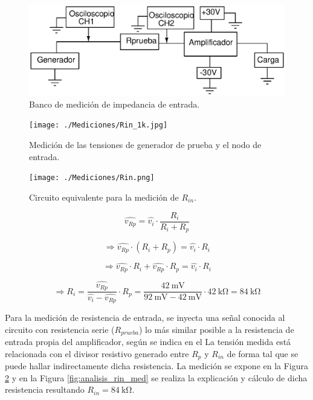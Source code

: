 		\begin{figure}[ H]
			\centering
			\includegraphics[scale=0.6]{./Figuras/bco_zo.eps}
			\caption{Banco de medición de impedancia de entrada.}
			\label{fig:rin_bco_med}
		\end{figure}
			
		\begin{figure}[ H]
			\centering
			\texttt{[image: ./Mediciones/Rin\_1k.jpg]}
			\caption{Medición de las tensiones de generador de prueba y el nodo de entrada.}
			\label{fig:rin_med}
		\end{figure}

		\begin{figure}[ H]
			\centering
			\texttt{[image: ./Mediciones/Rin.png]}
			\caption{Circuito equivalente para la medición de $R_{in}$.}
			\label{fig:Rin_cequiv}
		\end{figure}

		\begin{equation*}
			\hat{{v}_{Rp}}  = \hat{{v}_{i}} \cdot {\frac{R_i}{{R_i}+{R_p}}}
		\end{equation*}

		\begin{equation*}
			\Rightarrow \hat{{v}_{Rp}} \cdot (R_i+R_p)  = \hat{{v}_{i}} \cdot {R_i} 
		\end{equation*}

		\begin{equation*}
			\Rightarrow \hat{{v}_{Rp}} \cdot R_i+\hat{{v}_{Rp}} \cdot R_p  = \hat{{v}_{i}} \cdot {R_i} 
		\end{equation*}

		\begin{equation*}
			\Rightarrow R_i = \frac{\hat{{v}_{Rp}}}{\hat{{v}_{i}}-\hat{{v}_{Rp}}} \cdot R_p  = \frac{\SI{42}{\mV}}{\SI{92}{\mV} - \SI{42}{\mV}} \cdot \SI{42}{\kilo\ohm}  = \boxed{\SI{84}{\kilo\ohm}}
		\end{equation*}

		Para la medición de resistencia de entrada, se inyecta una señal conocida al circuito con resistencia serie ($R_{prueba}$) lo más similar posible a la resistencia de entrada propia del amplificador, según se indica en el La tensión medida está relacionada con el divisor resistivo generado entre $R_{p}$ y $R_{in}$ de forma tal que se puede hallar indirectamente dicha resistencia. La medición se expone en la Figura \ref{fig:rin_med} y en la Figura \ref{fig:analisis_rin_med} se realiza la explicación y cálculo de dicha resistencia resultando $\boxed{R_{in}=\SI{84}{\kilo\ohm}}$.\\

